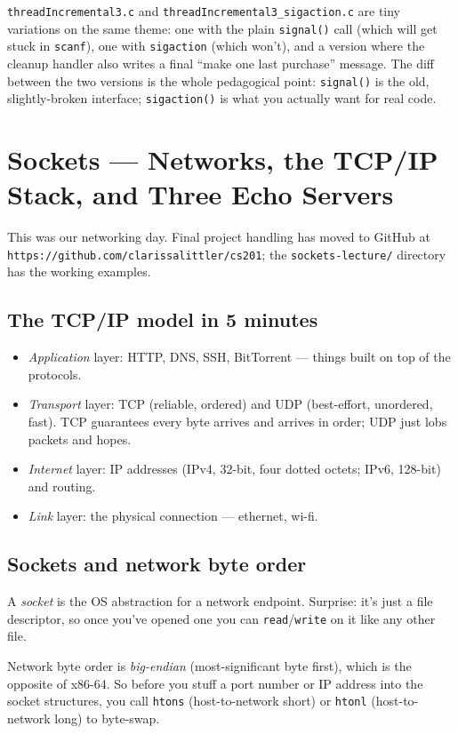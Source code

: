 \documentclass[11pt]{article}
\begin{document}
\texttt{threadIncremental3.c} and
\texttt{threadIncremental3\_sigaction.c} are tiny variations on
the same theme: one with the plain \texttt{signal()} call (which
will get stuck in \texttt{scanf}), one with \texttt{sigaction}
(which won't), and a version where the cleanup handler also writes
a final ``make one last purchase'' message. The diff between the
two versions is the whole pedagogical point: \texttt{signal()} is
the old, slightly-broken interface; \texttt{sigaction()} is what
you actually want for real code.

\section{Sockets --- Networks, the TCP/IP Stack, and Three Echo Servers}

This was our networking day. Final project handling has moved to
GitHub at \texttt{https://github.com/clarissalittler/cs201}; the
\texttt{sockets-lecture/} directory has the working examples.

\subsection*{The TCP/IP model in 5 minutes}

\begin{itemize}
  \item \emph{Application} layer: HTTP, DNS, SSH, BitTorrent ---
    things built on top of the protocols.
  \item \emph{Transport} layer: TCP (reliable, ordered) and UDP
    (best-effort, unordered, fast). TCP guarantees every byte
    arrives and arrives in order; UDP just lobs packets and hopes.
  \item \emph{Internet} layer: IP addresses (IPv4, 32-bit, four
    dotted octets; IPv6, 128-bit) and routing.
  \item \emph{Link} layer: the physical connection --- ethernet,
    wi-fi.
\end{itemize}

\subsection*{Sockets and network byte order}

A \emph{socket} is the OS abstraction for a network endpoint.
Surprise: it's just a file descriptor, so once you've opened one
you can \texttt{read}/\texttt{write} on it like any other file.

Network byte order is \emph{big-endian} (most-significant byte
first), which is the opposite of x86-64. So before you stuff a port
number or IP address into the socket structures, you call
\texttt{htons} (host-to-network short) or \texttt{htonl}
(host-to-network long) to byte-swap.
\end{document}
